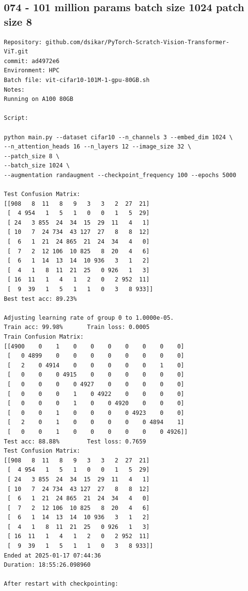 \subsection{074 - 101 million params batch size 1024 patch size 8}
\label{app_res:074}
\begin{verbatim}
Repository: github.com/dsikar/PyTorch-Scratch-Vision-Transformer-ViT.git
commit: ad4972e6
Environment: HPC 
Batch file: vit-cifar10-101M-1-gpu-80GB.sh
Notes: 
Running on A100 80GB

Script:

python main.py --dataset cifar10 --n_channels 3 --embed_dim 1024 \
--n_attention_heads 16 --n_layers 12 --image_size 32 \
--patch_size 8 \
--batch_size 1024 \
--augmentation randaugment --checkpoint_frequency 100 --epochs 5000

Test Confusion Matrix:
[[908   8  11   8   9   3   3   2  27  21]
 [  4 954   1   5   1   0   0   1   5  29]
 [ 24   3 855  24  34  15  29  11   4   1]
 [ 10   7  24 734  43 127  27   8   8  12]
 [  6   1  21  24 865  21  24  34   4   0]
 [  7   2  12 106  10 825   8  20   4   6]
 [  6   1  14  13  14  10 936   3   1   2]
 [  4   1   8  11  21  25   0 926   1   3]
 [ 16  11   1   4   1   2   0   2 952  11]
 [  9  39   1   5   1   1   0   3   8 933]]
Best test acc: 89.23%

Adjusting learning rate of group 0 to 1.0000e-05.
Train acc: 99.98%       Train loss: 0.0005
Train Confusion Matrix:
[[4900    0    1    0    0    0    0    0    0    0]
 [   0 4899    0    0    0    0    0    0    0    0]
 [   2    0 4914    0    0    0    0    0    1    0]
 [   0    0    0 4915    0    0    0    0    0    0]
 [   0    0    0    0 4927    0    0    0    0    0]
 [   0    0    0    1    0 4922    0    0    0    0]
 [   0    0    0    1    0    0 4920    0    0    0]
 [   0    0    1    0    0    0    0 4923    0    0]
 [   2    0    1    0    0    0    0    0 4894    1]
 [   0    0    1    0    0    0    0    0    0 4926]]
Test acc: 88.88%        Test loss: 0.7659
Test Confusion Matrix:
[[908   8  11   8   9   3   3   2  27  21]
 [  4 954   1   5   1   0   0   1   5  29]
 [ 24   3 855  24  34  15  29  11   4   1]
 [ 10   7  24 734  43 127  27   8   8  12]
 [  6   1  21  24 865  21  24  34   4   0]
 [  7   2  12 106  10 825   8  20   4   6]
 [  6   1  14  13  14  10 936   3   1   2]
 [  4   1   8  11  21  25   0 926   1   3]
 [ 16  11   1   4   1   2   0   2 952  11]
 [  9  39   1   5   1   1   0   3   8 933]]
Ended at 2025-01-17 07:44:36
Duration: 18:55:26.098960

After restart with checkpointing:


\end{verbatim}
